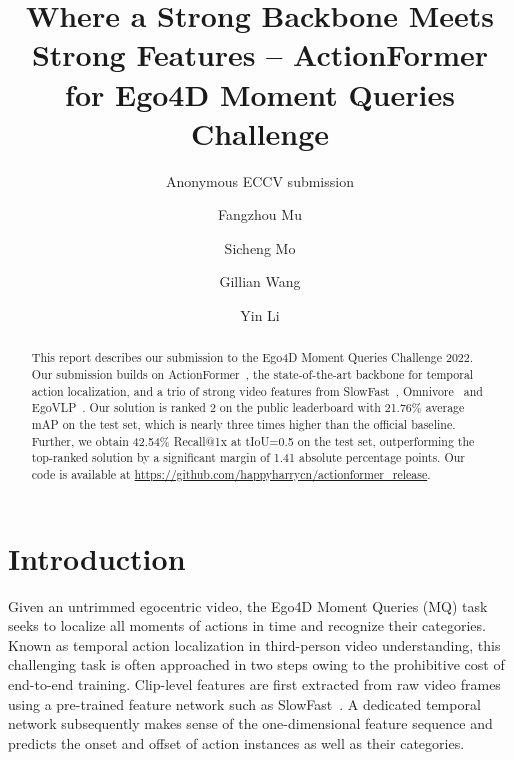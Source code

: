 \documentclass[runningheads]{llncs}
\begin{document}
\pagestyle{headings}
\mainmatter
\def\ECCVSubNumber{100}  

\title{Where a Strong Backbone Meets Strong Features -- ActionFormer for Ego4D Moment Queries Challenge} 

\authorrunning{ECCV-22 submission ID \ECCVSubNumber} 
\author{Anonymous ECCV submission}
\institute{Paper ID \ECCVSubNumber}




\author{Fangzhou Mu \and
Sicheng Mo \and
Gillian Wang \and
Yin Li}

\maketitle

\begin{abstract}
This report describes our submission to the Ego4D Moment Queries Challenge 2022. Our submission builds on ActionFormer~\cite{zhang2022actionformer}, the state-of-the-art backbone for temporal action localization, and a trio of strong video features from SlowFast~\cite{Feichtenhofer_2019_ICCV}, Omnivore~\cite{girdhar2022omnivore} and EgoVLP~\cite{kevin2022egovlp}. Our solution is ranked 2 on the public leaderboard with 21.76\% average mAP on the test set, which is nearly three times higher than the official baseline. Further, we obtain 42.54\% Recall@1x at tIoU=0.5 on the test set, outperforming the top-ranked solution by a significant margin of 1.41 absolute percentage points. Our code is available at \url{ https://github.com/happyharrycn/actionformer\_release}.

\end{abstract}


\section{Introduction}

Given an untrimmed egocentric video, the Ego4D Moment Queries (MQ) task seeks to localize all moments of actions in time and recognize their categories. Known as temporal action localization in third-person video understanding, this challenging task is often approached in two steps owing to the prohibitive cost of end-to-end training. Clip-level features are first extracted from raw video frames using a pre-trained feature network such as SlowFast~\cite{Feichtenhofer_2019_ICCV}. A dedicated temporal network subsequently makes sense of the one-dimensional feature sequence and predicts the onset and offset of action instances as well as their categories.
\end{document}
